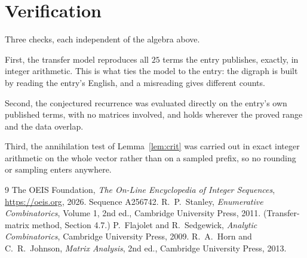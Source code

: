 \documentclass[11pt,a4paper]{article}
\theoremstyle{plain}
\theoremstyle{definition}
\begin{document}
\section{Verification}

Three checks, each independent of the algebra above.

First, the transfer model reproduces all $25$ terms the entry publishes, exactly, in
integer arithmetic. This is what ties the model to the entry: the digraph is built by reading
the entry's English, and a misreading gives different counts.

Second, the conjectured recurrence was evaluated directly on the entry's own published terms,
with no matrices involved, and holds wherever the proved range and the data overlap.

Third, the annihilation test of Lemma~\ref{lem:crit} was carried out in exact integer
arithmetic on the whole vector rather than on a sampled prefix, so no rounding or sampling
enters anywhere.

\begin{thebibliography}{9}
 The OEIS Foundation, \emph{The On-Line Encyclopedia of Integer
Sequences}, \url{https://oeis.org}, 2026. Sequence A256742.
 R.~P.~Stanley, \emph{Enumerative Combinatorics}, Volume 1, 2nd ed.,
Cambridge University Press, 2011. (Transfer-matrix method, Section 4.7.)
 P.~Flajolet and R.~Sedgewick, \emph{Analytic Combinatorics}, Cambridge
University Press, 2009.
 R.~A.~Horn and C.~R.~Johnson, \emph{Matrix Analysis}, 2nd ed., Cambridge
University Press, 2013.
\end{thebibliography}
\end{document}

